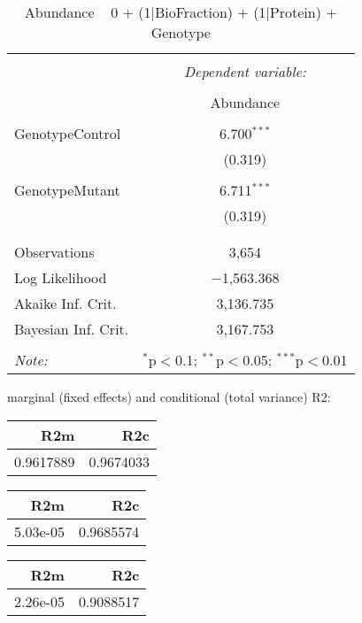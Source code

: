 \documentclass[11pt]{report}
\begin{document}
\begin{table}[!htbp] \centering 
  \caption{Abundance ~ 0 + (1|BioFraction) + (1|Protein) + Genotype} 
  \label{} 
\begin{tabular}{@{\extracolsep{5pt}}lc} 
\\[-1.8ex]\hline 
\hline \\[-1.8ex] 
 & \multicolumn{1}{c}{\textit{Dependent variable:}} \\ 
\cline{2-2} 
\\[-1.8ex] & Abundance \\ 
\hline \\[-1.8ex] 
 GenotypeControl & 6.700$^{***}$ \\ 
  & (0.319) \\ 
  & \\ 
 GenotypeMutant & 6.711$^{***}$ \\ 
  & (0.319) \\ 
  & \\ 
\hline \\[-1.8ex] 
Observations & 3,654 \\ 
Log Likelihood & $-$1,563.368 \\ 
Akaike Inf. Crit. & 3,136.735 \\ 
Bayesian Inf. Crit. & 3,167.753 \\ 
\hline 
\hline \\[-1.8ex] 
\textit{Note:}  & \multicolumn{1}{r}{$^{*}$p$<$0.1; $^{**}$p$<$0.05; $^{***}$p$<$0.01} \\ 
\end{tabular} 
\end{table} 
marginal (fixed effects) and conditional (total variance) R2:

\begin{tabular}{r|r}
\hline
R2m & R2c\\
\hline
0.9617889 & 0.9674033\\
\hline
\end{tabular}

\begin{tabular}{r|r}
\hline
R2m & R2c\\
\hline
5.03e-05 & 0.9685574\\
\hline
\end{tabular}

\begin{tabular}{r|r}
\hline
R2m & R2c\\
\hline
2.26e-05 & 0.9088517\\
\hline
\end{tabular}
\end{document}
